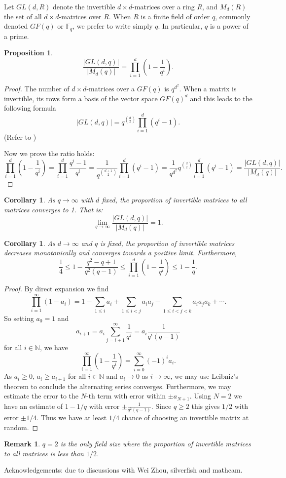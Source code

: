 \documentclass[12pt]{article}
\newtheorem{coro}[thm]{Corollary}
\newtheorem{prop}[thm]{Proposition}
\newtheorem{remark}[thm]{Remark}
\begin{document}
Let $GL(d,R)$ denote the invertible $d\times d$-matrices over a ring $R$, and
$M_d(R)$ the set of all $d\times d$-matrices over $R$.  When $R$ is a finite field of order $q$, commonly denoted $GF(q)$ or $\mathbb{F}_q$, we prefer to write simply $q$.  In particular, $q$ is a power of a prime.

\begin{prop}
\[
\frac{|GL(d,q)|}{|M_d(q)|}=\prod_{i=1}^d \left( 1-\frac{1}{q^i}\right).
\]
\end{prop}
\begin{proof}
The number of $d\times d$-matrices over a $GF(q)$ is $q^{d^2}$.  When a matrix
is invertible, its rows form a basis of the vector space $GF(q)^d$ and this 
leads to the following formula 
\[|GL(d,q)|=q^{\binom{d}{2}}\prod_{i=1}^d (q^i-1).\]
(Refer to )

Now we prove the ratio holds:
\[
\prod_{i=1}^d \left( 1-\frac{1}{q^i}\right)
= \prod_{i=1}^d \frac{q^i-1}{q^i}
= \frac{1}{q^{\binom{d+1}{2}}}\prod_{i=1}^d (q^i-1)
= \frac{1}{q^{d^2}}q^{\binom{d}{2}}\prod_{i=1}^d (q^i-1)
   = \frac{|GL(d,q)|}{|M_d(q)|}.
\]
\end{proof}


\begin{coro}
As $q\rightarrow \infty$ with $d$ fixed, the proportion of invertible matrices
to all matrices converges to 1.  That is:
\[
\lim_{q\rightarrow \infty} \frac{|GL(d,q)|}{|M_d(q)|}=1.
\]
\end{coro}

\begin{coro}\label{coro:random-mat}
As $d\rightarrow \infty$ and $q$ is fixed, the proportion of invertible matrices decreases monotonically and converges towards a positive limit.  Furthermore,
\[\frac{1}{4} \leq 1-\frac{q^2-q+1}{q^2 (q-1)} \leq 
\prod_{i=1}^d\left(1-\frac{1}{q^i}\right) \leq 1-\frac{1}{q}.\]
\end{coro}
\begin{proof}
By direct expansion we find
\[
\prod_{i=1}^\infty (1-a_i)=1-\sum_{1\leq i} a_i+\sum_{1\leq i<j} a_i a_j
	- \sum_{1\leq i<j<k} a_i a_j a_k +\cdots.
\]
So setting $a_0=1$ and
\[a_{i+1}=a_i\sum_{j=i+1}^\infty \frac{1}{q^j}=a_i\frac{1}{q^{i}(q-1)}\]
for all $i\in\mathbb{N}$, we have
\[
\prod_{i=1}^\infty\left(1-\frac{1}{q^i}\right) = \sum_{i=0}^\infty (-1)^i a_i.
\]
As $a_i\geq 0$, $a_{i}\geq a_{i+1}$ for all $i\in\mathbb{N}$ and $a_i\rightarrow 0$ 
as $i\rightarrow \infty$, we may use Leibniz's theorem to conclude the alternating
series converges.  Furthermore, we may estimate the error to the $N$-th term with
error within $\pm a_{N+1}$.  Using $N=2$ we have an estimate of $1-1/q$ with error
$\pm \frac{1}{q^2(q-1)}$.  Since $q\geq 2$ this gives $1/2$ with error $\pm 1/4$.  Thus
we have at least $1/4$ chance of choosing an invertible matrix at random.
\end{proof}

\begin{remark}
$q=2$ is the only field size where the proportion of invertible matrices to all matrices is less than $1/2$.
\end{remark}


Acknowledgements: due to discussions with Wei Zhou, silverfish and mathcam.  
\end{document}
